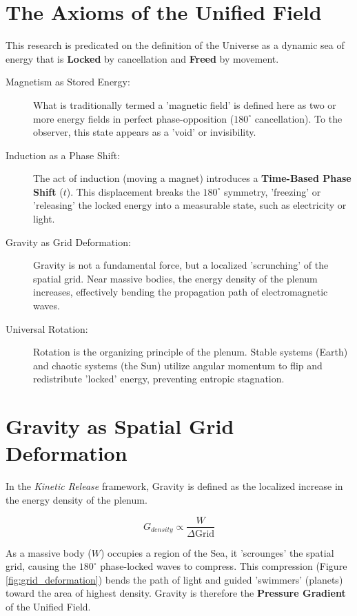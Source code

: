 \documentclass[11pt]{article}
\begin{document}
\section*{The Axioms of the Unified Field}
This research is predicated on the definition of the Universe as a dynamic sea of energy that is \textbf{Locked} by cancellation and \textbf{Freed} by movement.

\begin{description}
    \item[Magnetism as Stored Energy:] What is traditionally termed a 'magnetic field' is defined here as two or more energy fields in perfect phase-opposition ($180^\circ$ cancellation). To the observer, this state appears as a 'void' or invisibility.
    
    \item[Induction as a Phase Shift:] The act of induction (moving a magnet) introduces a \textbf{Time-Based Phase Shift} ($t$). This displacement breaks the $180^\circ$ symmetry, 'freezing' or 'releasing' the locked energy into a measurable state, such as electricity or light.
    
    \item[Gravity as Grid Deformation:] Gravity is not a fundamental force, but a localized 'scrunching' of the spatial grid. Near massive bodies, the energy density of the plenum increases, effectively bending the propagation path of electromagnetic waves.
    
    \item[Universal Rotation:] Rotation is the organizing principle of the plenum. Stable systems (Earth) and chaotic systems (the Sun) utilize angular momentum to flip and redistribute 'locked' energy, preventing entropic stagnation.
\end{description}

\section*{Gravity as Spatial Grid Deformation}
In the \textit{Kinetic Release} framework, Gravity is defined as the localized increase in the energy density of the plenum. 

\begin{equation}
    G_{density} \propto \frac{W}{\Delta \text{Grid}}
\end{equation}

As a massive body ($W$) occupies a region of the Sea, it 'scrounges' the spatial grid, causing the $180^\circ$ phase-locked waves to compress. This compression (Figure \ref{fig:grid_deformation}) bends the path of light and guided 'swimmers' (planets) toward the area of highest density. Gravity is therefore the \textbf{Pressure Gradient} of the Unified Field.
\end{document}

